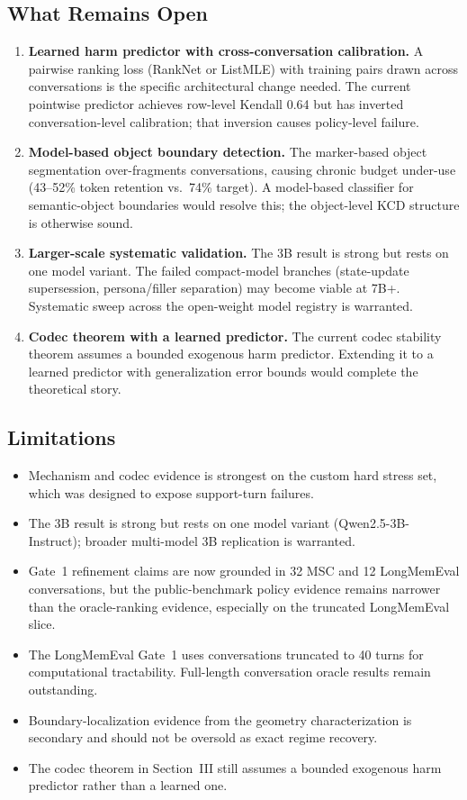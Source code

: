 \documentclass[conference]{IEEEtran}
\begin{document}
\subsection{What Remains Open}
\begin{enumerate}[leftmargin=1.4em]
    \item \textbf{Learned harm predictor with cross-conversation calibration.} A pairwise ranking loss (RankNet or ListMLE) with training pairs drawn across conversations is the specific architectural change needed. The current pointwise predictor achieves row-level Kendall 0.64 but has inverted conversation-level calibration; that inversion causes policy-level failure.
    \item \textbf{Model-based object boundary detection.} The marker-based object segmentation over-fragments conversations, causing chronic budget under-use (43--52\% token retention vs.\ 74\% target). A model-based classifier for semantic-object boundaries would resolve this; the object-level KCD structure is otherwise sound.
    \item \textbf{Larger-scale systematic validation.} The 3B result is strong but rests on one model variant. The failed compact-model branches (state-update supersession, persona/filler separation) may become viable at 7B+. Systematic sweep across the open-weight model registry is warranted.
    \item \textbf{Codec theorem with a learned predictor.} The current codec stability theorem assumes a bounded exogenous harm predictor. Extending it to a learned predictor with generalization error bounds would complete the theoretical story.
\end{enumerate}

\subsection{Limitations}
\begin{itemize}[leftmargin=1.4em]
    \item Mechanism and codec evidence is strongest on the custom hard stress set, which was designed to expose support-turn failures.
    \item The 3B result is strong but rests on one model variant (Qwen2.5-3B-Instruct); broader multi-model 3B replication is warranted.
    \item Gate~1 refinement claims are now grounded in 32 MSC and 12 LongMemEval conversations, but the public-benchmark policy evidence remains narrower than the oracle-ranking evidence, especially on the truncated LongMemEval slice.
    \item The LongMemEval Gate~1 uses conversations truncated to 40 turns for computational tractability. Full-length conversation oracle results remain outstanding.
    \item Boundary-localization evidence from the geometry characterization is secondary and should not be oversold as exact regime recovery.
    \item The codec theorem in Section~III still assumes a bounded exogenous harm predictor rather than a learned one.
\end{itemize}
\end{document}
